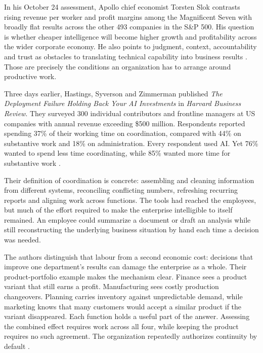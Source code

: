 \begin{EssayColumns}

In his October 24 assessment, Apollo chief economist Torsten Slok
contrasts rising revenue per worker and profit margins among the
Magnificent Seven with broadly flat results across the other 493
companies in the S\&P 500. His question is whether cheaper intelligence
will become higher growth and profitability across the wider corporate
economy. He also points to judgment, context, accountability and trust
as obstacles to translating technical capability into business results
\citep{slok2026payoff}. Those are precisely the conditions an
organization has to arrange around productive work.

Three days earlier, Hastings, Syverson and Zimmerman published \emph{The
Deployment Failure Holding Back Your AI Investments} in \emph{Harvard
Business Review}. They surveyed 300 individual contributors and
frontline managers at US companies with annual revenue exceeding \$500
million. Respondents reported spending 37\% of their working time on
coordination, compared with 44\% on substantive work and 18\% on
administration. Every respondent used AI. Yet 76\% wanted to spend less
time coordinating, while 85\% wanted more time for substantive work
\citep{hastings2026deployment}.

\NextEssayColumn

Their definition of coordination is concrete: assembling and cleaning
information from different systems, reconciling conflicting numbers,
refreshing recurring reports and aligning work across functions. The
tools had reached the employees, but much of the effort required to make
the enterprise intelligible to itself remained. An employee could
summarize a document or draft an analysis while still reconstructing the
underlying business situation by hand each time a decision was needed.

The authors distinguish that labour from a second economic cost:
decisions that improve one department's results can damage the
enterprise as a whole. Their product-portfolio example makes the
mechanism clear. Finance sees a product variant that still earns a
profit. Manufacturing sees costly production changeovers. Planning
carries inventory against unpredictable demand, while marketing knows
that many customers would accept a similar product if the variant
disappeared. Each function holds a useful part of the answer. Assessing
the combined effect requires work across all four, while keeping the
product requires no such agreement. The organization repeatedly
authorizes continuity by default \citep{hastings2026deployment}.

\end{EssayColumns}

